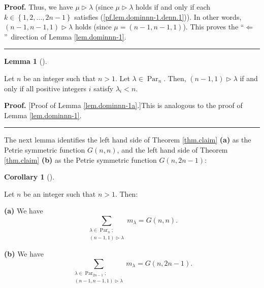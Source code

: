 \documentclass[numbers=enddot,12pt,final,onecolumn,notitlepage]{scrartcl}%
\theoremstyle{definition}
\newtheorem{lem}[theo]{Lemma}
\newenvironment{lemma}[1][]
{\begin{lem}[#1]\begin{leftbar}}
{\end{leftbar}\end{lem}}
\newtheorem{coro}[theo]{Corollary}
\newenvironment{corollary}[1][]
{\begin{coro}[#1]\begin{leftbar}}
{\end{leftbar}\end{coro}}
\newenvironment{proof}[1][Proof]{\noindent\textbf{#1.} }{\ \rule{0.5em}{0.5em}}
\let\sumnonlimits\sum
\renewcommand{\sum}{\sumnonlimits\limits}
\newenvironment{verlong}{}{}
\begin{document}
\begin{verlong}
\begin{proof}
Thus, we have $\mu\triangleright\lambda$ (since $\mu\triangleright\lambda$
holds if and only if each $k\in\left\{  1,2,\ldots,2n-1\right\}  $ satisfies
(\ref{pf.lem.dominnn-1.denn.1})). In other words, $\left(  n-1,n-1,1\right)
\triangleright\lambda$ holds (since $\mu=\left(  n-1,n-1,1\right)  $). This
proves the \textquotedblleft$\Longleftarrow$\textquotedblright\ direction of
Lemma \ref{lem.dominnn-1}.
\end{proof}
\end{verlong}

\begin{lemma}
\label{lem.dominnn-1a}Let $n$ be an integer such that $n>1$. Let $\lambda
\in\operatorname*{Par}\nolimits_{n}$. Then, $\left(  n-1,1\right)
\triangleright\lambda$ if and only if all positive integers $i$ satisfy
$\lambda_{i}<n$.
\end{lemma}

\begin{proof}
[Proof of Lemma \ref{lem.dominnn-1a}.]This is analogous to the proof of Lemma
\ref{lem.dominnn-1}.
\end{proof}

The next lemma identifies the left hand side of Theorem \ref{thm.claim}
\textbf{(a)} as the Petrie symmetric function $G\left(  n,n\right)  $, and the
left hand side of Theorem \ref{thm.claim} \textbf{(b)} as the Petrie symmetric
function $G\left(  n,2n-1\right)  $:

\begin{corollary}
\label{cor.LHS1}Let $n$ be an integer such that $n>1$. Then:

\textbf{(a)} We have%
\[
\sum_{\substack{\lambda\in\operatorname*{Par}\nolimits_{n};\\\left(
n-1,1\right)  \triangleright\lambda}}m_{\lambda}=G\left(  n,n\right)  .
\]


\textbf{(b)} We have%
\[
\sum_{\substack{\lambda\in\operatorname*{Par}\nolimits_{2n-1};\\\left(
n-1,n-1,1\right)  \triangleright\lambda}}m_{\lambda}=G\left(  n,2n-1\right)
.
\]

\end{corollary}
\end{document}
